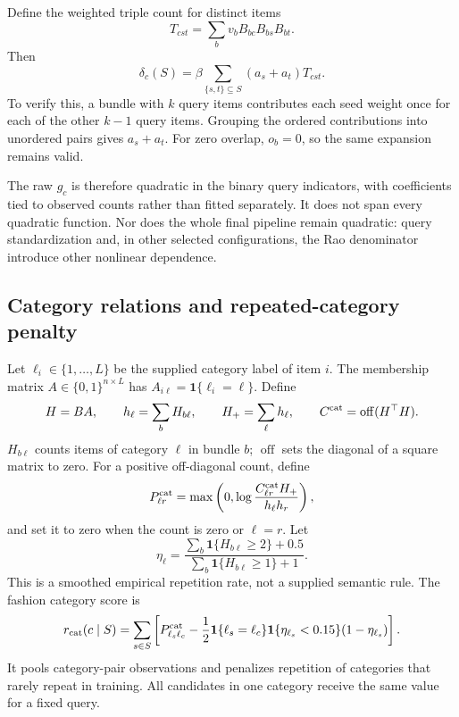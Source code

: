 \documentclass[11pt,a4paper]{article}
\newcommand{\ind}{\mathbf 1}
\newcommand{\off}{\operatorname{off}}
\begin{document}
Define the weighted triple count for distinct items
\begin{equation}
 T_{cst}=\sum_b v_b B_{bc}B_{bs}B_{bt}.
\end{equation}
Then
\begin{equation}
 \delta_c(S)=\beta\sum_{\{s,t\}\subseteq S}(a_s+a_t)T_{cst}.
 \label{eq:triple}
\end{equation}
To verify this, a bundle with $k$ query items contributes each seed weight
once for each of the other $k-1$ query items. Grouping the ordered
contributions into unordered pairs gives $a_s+a_t$. For zero overlap,
$o_b=0$, so the same expansion remains valid.

The raw $g_c$ is therefore quadratic in the binary query indicators, with
coefficients tied to observed counts rather than fitted separately. It does
not span every quadratic function. Nor does the whole final pipeline remain
quadratic: query standardization and, in other selected configurations, the
Rao denominator introduce other nonlinear dependence.

\subsection{Category relations and repeated-category penalty}

Let $\ell_i\in\{1,\ldots,L\}$ be the supplied category label of item $i$.
The membership matrix $A\in\{0,1\}^{n\times L}$ has
$A_{i\ell}=\ind\{\ell_i=\ell\}$. Define
\begin{equation}
 H=BA,\qquad h_\ell=\sum_b H_{b\ell},\qquad H_+=\sum_\ell h_\ell,
 \qquad C^{\rm cat}=\off(H^\top H).
\end{equation}
$H_{b\ell}$ counts items of category $\ell$ in bundle $b$;
$\off$ sets the diagonal of a square matrix to zero. For a positive
off-diagonal count, define
\begin{equation}
 P^{\rm cat}_{\ell r}
   =\max\left(0,\log\frac{C^{\rm cat}_{\ell r}H_+}{h_\ell h_r}\right),
\end{equation}
and set it to zero when the count is zero or $\ell=r$. Let
\begin{equation}
 \eta_\ell=
 \frac{\sum_b\ind\{H_{b\ell}\geq2\}+0.5}
      {\sum_b\ind\{H_{b\ell}\geq1\}+1}.
\end{equation}
This is a smoothed empirical repetition rate, not a supplied semantic rule.
The fashion category score is
\begin{equation}
 r_{\rm cat}(c\mid S)=\sum_{s\in S}
 \left[P^{\rm cat}_{\ell_s\ell_c}
 -\frac12\ind\{\ell_s=\ell_c\}\ind\{\eta_{\ell_s}<0.15\}
                      (1-\eta_{\ell_s})\right].
\end{equation}
It pools category-pair observations and penalizes repetition of categories
that rarely repeat in training. All candidates in one category receive the
same value for a fixed query.
\end{document}
